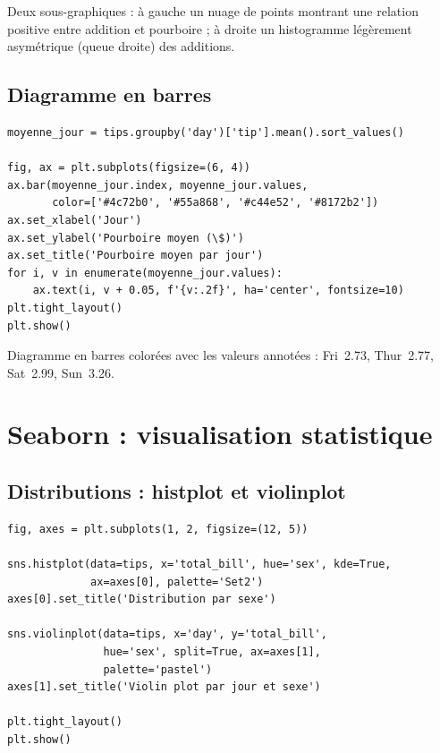 \begin{codeoutput}
Deux sous-graphiques : \`a gauche un nuage de points montrant une relation positive entre addition et pourboire ; \`a droite un histogramme l\'eg\`erement asym\'etrique (queue droite) des additions.
\end{codeoutput}

\subsection{Diagramme en barres}

\begin{codeblock}[title=\textbf{Python}]
\begin{verbatim}
moyenne_jour = tips.groupby('day')['tip'].mean().sort_values()

fig, ax = plt.subplots(figsize=(6, 4))
ax.bar(moyenne_jour.index, moyenne_jour.values,
       color=['#4c72b0', '#55a868', '#c44e52', '#8172b2'])
ax.set_xlabel('Jour')
ax.set_ylabel('Pourboire moyen (\$)')
ax.set_title('Pourboire moyen par jour')
for i, v in enumerate(moyenne_jour.values):
    ax.text(i, v + 0.05, f'{v:.2f}', ha='center', fontsize=10)
plt.tight_layout()
plt.show()
\end{verbatim}
\end{codeblock}

\begin{codeoutput}
Diagramme en barres color\'ees avec les valeurs annot\'ees : Fri~2.73, Thur~2.77, Sat~2.99, Sun~3.26.
\end{codeoutput}

\section{Seaborn : visualisation statistique}

\subsection{Distributions : histplot et violinplot}

\begin{codeblock}[title=\textbf{Python}]
\begin{verbatim}
fig, axes = plt.subplots(1, 2, figsize=(12, 5))

sns.histplot(data=tips, x='total_bill', hue='sex', kde=True,
             ax=axes[0], palette='Set2')
axes[0].set_title('Distribution par sexe')

sns.violinplot(data=tips, x='day', y='total_bill',
               hue='sex', split=True, ax=axes[1],
               palette='pastel')
axes[1].set_title('Violin plot par jour et sexe')

plt.tight_layout()
plt.show()
\end{verbatim}
\end{codeblock}

